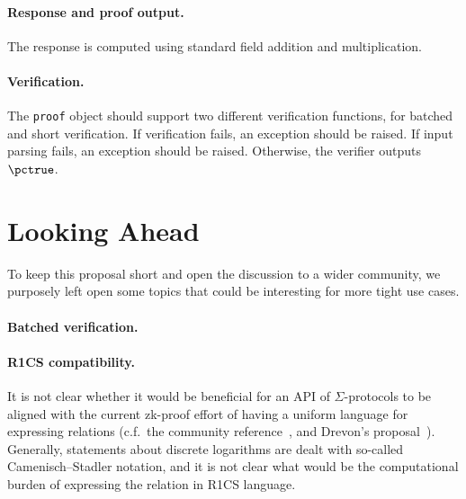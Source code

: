 \documentclass[runningheads]{llncs}
\begin{document}
\paragraph{Response and proof output.} The response is computed using standard field addition and multiplication.
\paragraph{Verification.} The \verb|proof| object should support two different verification functions, for batched and short verification.
If verification fails, an exception should be raised.
If input parsing fails, an exception should be raised.
Otherwise, the verifier outputs $\pctrue$.





\section{Looking Ahead}
To keep this proposal short and open the discussion to a wider community, we purposely left open some topics that could
be interesting for more tight use cases.
\paragraph{Batched verification.}
\paragraph{R1CS compatibility.} It is not clear whether it would be beneficial for an API of $\Sigma$-protocols to be aligned with the current zk-proof effort of having a uniform
language for expressing relations (c.f.\ the community reference~\cite[section 3]{zkproof-reference}, and Drevon's proposal~\cite{jr1cs}).
Generally, statements about discrete logarithms are dealt with so-called Camenisch--Stadler notation, and it is not clear what would be the computational burden of expressing the relation in R1CS language.



%
\end{document}
